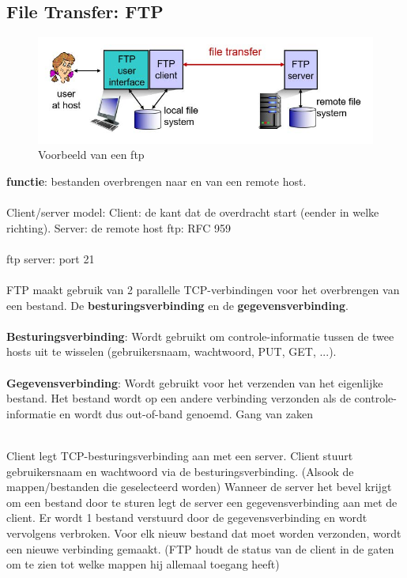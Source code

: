 \subsection{File Transfer: FTP}

\begin{figure}[h]
\centering
\includegraphics[width=4.5in]{./img/imghfdst2/ftp.jpg}
\caption{Voorbeeld van een ftp }
\label{fig:ftp}
\end{figure}

\noindent \textbf{functie}: bestanden overbrengen naar en van een remote host.\\\\
Client/server model:
\bi
\itf Client: de kant dat de overdracht start (eender in welke richting).
\itf Server: de remote host
\ei
ftp: RFC 959\\\\
ftp server: port 21\\\\
FTP maakt gebruik van 2 parallelle TCP-verbindingen voor het overbrengen van een bestand. De \textbf{besturingsverbinding} en de \textbf{gegevensverbinding}.\\\\
\textbf{Besturingsverbinding}: Wordt gebruikt om controle-informatie tussen de twee hosts uit te wisselen (gebruikersnaam, wachtwoord, PUT, GET, ...).\\\\
\textbf{Gegevensverbinding}: Wordt gebruikt voor het verzenden van het eigenlijke bestand. Het bestand wordt op een andere verbinding verzonden als de controle-informatie en wordt dus out-of-band genoemd.
Gang van zaken\\\

\be
\itf Client legt TCP-besturingsverbinding aan met een server.
\itf Client stuurt gebruikersnaam en wachtwoord via de besturingsverbinding. (Alsook de mappen/bestanden die geselecteerd worden)
\itf Wanneer de server het bevel krijgt om een bestand door te sturen legt de server een gegevensverbinding aan met de client.
\itf Er wordt 1 bestand verstuurd door de gegevensverbinding en wordt vervolgens verbroken. Voor elk nieuw bestand dat moet worden verzonden, wordt een nieuwe verbinding gemaakt.
\itf (FTP houdt de status van de client in de gaten om te zien tot welke mappen hij allemaal toegang heeft)
\ee

